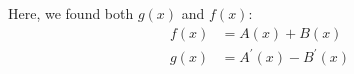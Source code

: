 Here, we found both $g(x)$ and $f(x)$:
%
\begin{align}
  f(x) & = A(x) + B(x)\\
  g(x) & = A^\prime(x) - B^\prime(x)
\end{align}

%





